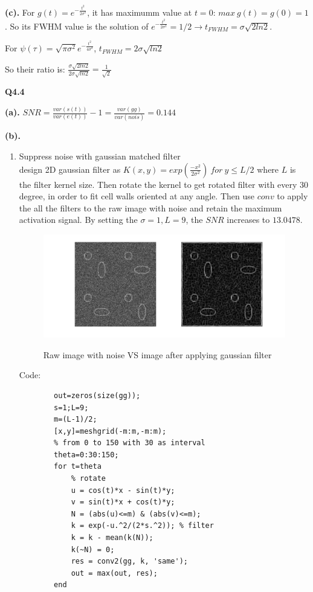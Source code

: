 \documentclass[12pt,a4paper]{article}
\begin{document}
    \noindent \textbf{(c).}
    For $g(t)=e^{-\frac{t^2}{2\sigma^2}}$, it has maximumm value at $t=0$: $max\ g(t) = g(0)=1$. So its FWHM value is the solution of $e^{-\frac{t^2}{2\sigma^2}}=1/2 \longrightarrow t_{FWHM}=\sigma\sqrt{2ln2}$.

    \noindent For $\psi(\tau)=\sqrt{\pi\sigma^2}e^{-\frac{t^2}{4\sigma^2}}$, $t_{FWHM}=2\sigma\sqrt{ln2}$

    \noindent So their ratio is: $\frac{\sigma\sqrt{2ln2}}{2\sigma\sqrt{ln2}}=\frac{1}{\sqrt{2}}$

    \newpage
    \Large{\textbf{Q4.4}}
    
    \textbf{(a).} $SNR=\frac{var(s(t))}{var(e(t))}-1=\frac{var(gg)}{var(nois)}=0.144$

    \textbf{(b).}
    \begin{enumerate}
        \item Suppress noise with gaussian matched filter \\
        design 2D gaussian filter as $K(x, y)=exp(\frac{-x^2}{2\sigma^2})\ for\ y \le L/2$ where $L$ is the filter kernel size. Then rotate the kernel to get rotated filter with every 30 degree, in order to fit cell walls oriented at any angle. Then use $conv$ to apply the all the filters to the raw image with noise and retain the maximum activation signal. By setting the $\sigma=1,L=9$, the $SNR$ increases to $13.0478$.
        \begin{figure}[!ht]
            \centering
            \includegraphics*[width=\textwidth]{g_fil.png}
            \label{fig:2}
            \caption{Raw image with noise VS image after applying gaussian filter}
        \end{figure}
        
        \vspace{-0.5cm}
        Code: \\
        \vspace{-0.5cm}
        \begin{lstlisting}
        out=zeros(size(gg));
        s=1;L=9;
        m=(L-1)/2;
        [x,y]=meshgrid(-m:m,-m:m); 
        % from 0 to 150 with 30 as interval
        theta=0:30:150;  
        for t=theta
            % rotate 
            u = cos(t)*x - sin(t)*y; 
            v = sin(t)*x + cos(t)*y;
            N = (abs(u)<=m) & (abs(v)<=m);
            k = exp(-u.^2/(2*s.^2)); % filter
            k = k - mean(k(N));
            k(~N) = 0;
            res = conv2(gg, k, 'same');
            out = max(out, res);
        end
        \end{lstlisting}


\end{enumerate}
\end{document}
